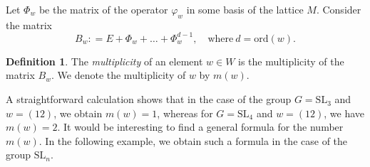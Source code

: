 \documentclass[a4paper,12pt]{amsart}
\theoremstyle{plain}
\theoremstyle{definition}
\newtheorem{definition}{Definition}
\newcommand{\SL}{\mathrm{SL}}
\newcommand{\ord}{\mathrm{ord}}
\begin{document}
\smallskip

Let $\Phi_w$ be the matrix of the operator $\varphi_w$ in some basis of the lattice $M$. Consider the matrix
$$
B_w: = E + \Phi_w + \ldots + \Phi_w^{d-1}, \quad \text{where} \  d=\ord(w).
$$

\begin{definition}
The \emph{multiplicity} of an element $w \in W$ is the multiplicity of the matrix $B_w$. We denote the multiplicity of $w$ by $m(w)$.
\end{definition}

A straightforward calculation shows that in the case of the group $G=\SL_3$ and $w=(12)$, we obtain $m(w)=1$, whereas for $G=\SL_4$ and $w=(12)$, we have $m(w)=2$. It would be interesting to find a general formula for the number $m(w)$. In the following example, we obtain such a formula in the case of the group $\SL_n$.
\end{document}
